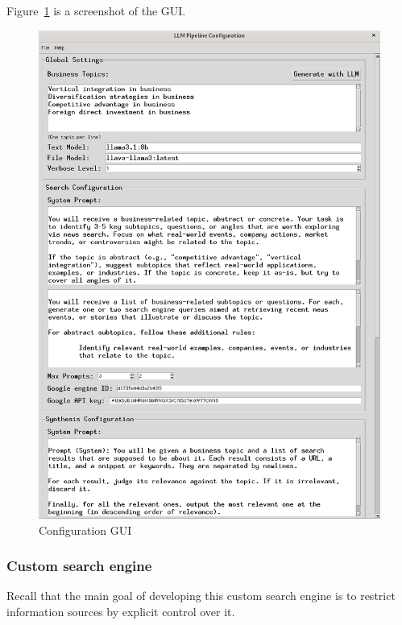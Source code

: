 \documentclass[final-report]{report-template}
\begin{document}
Figure~\ref{fig.config.gui} is a screenshot of the GUI.
\begin{figure}[hbtp!]
	\centering
	\includegraphics[height=.25\textheight]{res/gui.png}
	\caption{Configuration GUI}
	\label{fig.config.gui}
\end{figure}

\subsubsection{Custom search engine}
Recall that the main goal of developing this custom search engine is to 
restrict information sources by explicit control over it.
\end{document}

